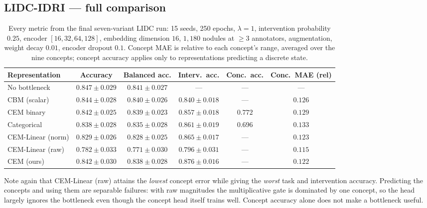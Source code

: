 \documentclass[11pt]{article}
\begin{document}
\subsection{LIDC-IDRI --- full comparison}

\begin{table}[h]
\centering
\caption{Every metric from the final seven-variant LIDC run: 15 seeds, 250
epochs, $\lambda = 1$, intervention probability $0.25$, encoder
$[16,32,64,128]$, embedding dimension $16$, $1{,}180$ nodules at $\geq 3$
annotators, augmentation, weight decay $0.01$, encoder dropout $0.1$. Concept
MAE is relative to each concept's range, averaged over the nine concepts;
concept accuracy applies only to representations predicting a discrete state.}
\label{tab:app-lidc-full}
\begin{tabular}{lccccc}
\toprule
\textbf{Representation} & \textbf{Accuracy} & \textbf{Balanced acc.} &
\textbf{Interv.\ acc.} & \textbf{Conc.\ acc.} & \textbf{Conc.\ MAE (rel)} \\
\midrule
No bottleneck    & $\mathbf{0.847 \pm 0.029}$ & $\mathbf{0.841 \pm 0.027}$ & --- & --- & --- \\
CBM (scalar)     & $0.844 \pm 0.028$ & $0.840 \pm 0.026$ & $0.840 \pm 0.018$ & --- & $0.126$ \\
CEM binary       & $0.842 \pm 0.025$ & $0.839 \pm 0.023$ & $0.857 \pm 0.018$ & $0.772$ & $0.129$ \\
Categorical      & $0.838 \pm 0.028$ & $0.835 \pm 0.028$ & $0.861 \pm 0.019$ & $0.696$ & $0.133$ \\
CEM-Linear (norm)& $0.829 \pm 0.026$ & $0.828 \pm 0.025$ & $0.865 \pm 0.017$ & --- & $0.123$ \\
CEM-Linear (raw) & $0.782 \pm 0.033$ & $0.771 \pm 0.030$ & $0.796 \pm 0.031$ & --- & $\mathbf{0.115}$ \\
CEM (ours)       & $0.842 \pm 0.030$ & $0.838 \pm 0.028$ & $\mathbf{0.876 \pm 0.016}$ & --- & $0.122$ \\
\bottomrule
\end{tabular}
\end{table}

Note again that CEM-Linear (raw) attains the \emph{lowest} concept error while
giving the \emph{worst} task and intervention accuracy. Predicting the concepts
and using them are separable failures: with raw magnitudes the multiplicative
gate is dominated by one concept, so the head largely ignores the bottleneck
even though the concept head itself trains well. Concept accuracy alone does
not make a bottleneck useful.
\end{document}
